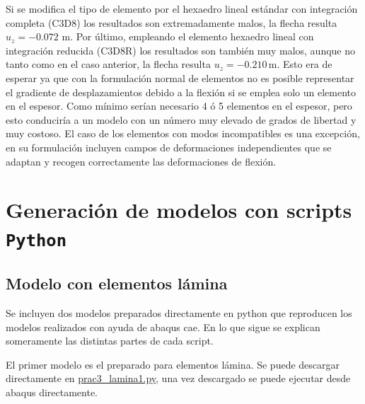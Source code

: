 \documentclass[spanish,a4paper,12pt]{article}
\begin{document}
Si se modifica el tipo de elemento por el hexaedro lineal estándar con integración completa (C3D8) los resultados son extremadamente malos, la flecha resulta $u_{z}=-0.072$ m.
Por último, empleando el elemento hexaedro lineal con integración reducida (C3D8R) los resultados son también muy malos, aunque no tanto como en el caso anterior, la flecha resulta $u_{z}=-0.210\,\text{m}$.
Esto era de esperar ya que con la formulación normal de elementos no es posible representar el gradiente de desplazamientos debido a la flexión si se emplea solo un elemento en el espesor. Como mínimo serían necesario 4 ó 5 elementos en el espesor, pero esto conduciría a un modelo con un número muy elevado de grados de libertad y muy costoso.
El caso de los elementos con modos incompatibles es una excepción, en su formulación incluyen campos de deformaciones independientes que se adaptan y recogen correctamente las deformaciones de flexión. 

\clearpage

\section{Generación de modelos con scripts \texttt{Python}}

\subsection{Modelo con elementos lámina}

Se incluyen dos modelos preparados directamente en python que reproducen los modelos realizados con ayuda de abaqus cae.
En lo que sigue se explican someramente las distintas partes de cada script.

El primer modelo es el preparado para elementos lámina.
Se puede descargar directamente en \href{http://stokes.mecanica.upm.es/MCIC_open/practicas/scripts-python/prac3_lamina1.py}{\ttfamily prac3\_lamina1.py}, una vez descargado se puede ejecutar desde abaqus directamente.
\end{document}

